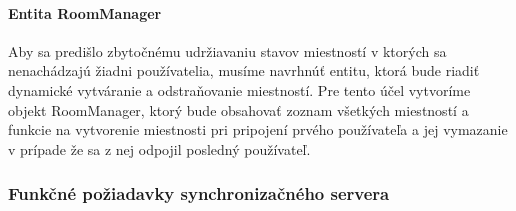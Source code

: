 \paragraph{Entita RoomManager}
Aby sa predišlo zbytočnému udržiavaniu stavov miestností v ktorých sa nenachádzajú žiadni používatelia, musíme navrhnúť entitu, ktorá bude riadiť dynamické vytváranie a odstraňovanie miestností. Pre tento účel vytvoríme objekt RoomManager, ktorý bude obsahovať zoznam všetkých miestností a funkcie na vytvorenie miestnosti pri pripojení prvého používateľa a jej vymazanie v prípade že sa z nej odpojil posledný používateľ.

\subsubsection{Funkčné požiadavky synchronizačného servera}

